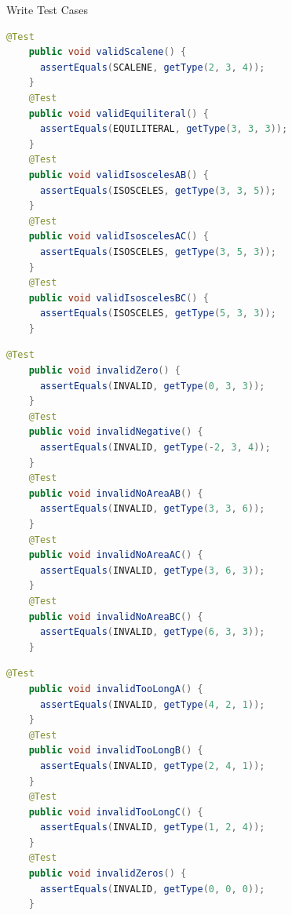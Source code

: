 \begin{Frame}{Write Test Cases}
  \begin{lstlisting}[language=java,gobble=4,basicstyle=\ttfamily\footnotesize]
    @Test
    public void validScalene() {
      assertEquals(SCALENE, getType(2, 3, 4));
    }
    @Test
    public void validEquiliteral() {
      assertEquals(EQUILITERAL, getType(3, 3, 3));
    }
    @Test
    public void validIsoscelesAB() {
      assertEquals(ISOSCELES, getType(3, 3, 5));
    }
    @Test
    public void validIsoscelesAC() {
      assertEquals(ISOSCELES, getType(3, 5, 3));
    }
    @Test
    public void validIsoscelesBC() {
      assertEquals(ISOSCELES, getType(5, 3, 3));
    }
  \end{lstlisting}

  \framebreak

  \begin{lstlisting}[language=java,gobble=4,basicstyle=\ttfamily\footnotesize]
    @Test
    public void invalidZero() {
      assertEquals(INVALID, getType(0, 3, 3));
    }
    @Test
    public void invalidNegative() {
      assertEquals(INVALID, getType(-2, 3, 4));
    }
    @Test
    public void invalidNoAreaAB() {
      assertEquals(INVALID, getType(3, 3, 6));
    }
    @Test
    public void invalidNoAreaAC() {
      assertEquals(INVALID, getType(3, 6, 3));
    }
    @Test
    public void invalidNoAreaBC() {
      assertEquals(INVALID, getType(6, 3, 3));
    }
  \end{lstlisting}

	\framebreak

  \begin{lstlisting}[language=java,gobble=4,basicstyle=\ttfamily\footnotesize]
    @Test
    public void invalidTooLongA() {
      assertEquals(INVALID, getType(4, 2, 1));
    }
    @Test
    public void invalidTooLongB() {
      assertEquals(INVALID, getType(2, 4, 1));
    }
    @Test
    public void invalidTooLongC() {
      assertEquals(INVALID, getType(1, 2, 4));
    }
    @Test
    public void invalidZeros() {
      assertEquals(INVALID, getType(0, 0, 0));
    }
  \end{lstlisting}
\end{Frame}

